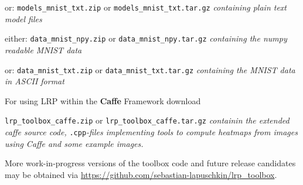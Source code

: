 \documentclass[a4wide]{article}
\begin{document}
or: \texttt{models\_mnist\_txt.zip} or \texttt{models\_mnist\_txt.tar.gz} \emph{containing plain text model files}

either: \texttt{data\_mnist\_npy.zip} or \texttt{data\_mnist\_npy.tar.gz} \emph{containing the numpy readable MNIST data}

or: \texttt{data\_mnist\_txt.zip} or \texttt{data\_mnist\_txt.tar.gz} \emph{containing the MNIST data in ASCII format}



\vspace{0.5cm}
For using LRP within the \textbf{Caffe} Framework download

\texttt{lrp\_toolbox\_caffe.zip} or \texttt{lrp\_toolbox\_caffe.tar.gz} \emph{containin the extended caffe source code,} \texttt{.cpp}\emph{-files implementing tools to compute heatmaps from images using Caffe and some example images.}

\vspace{0.5cm}
More work-in-progress versions of the toolbox code and future release candidates may be obtained via \url{https://github.com/sebastian-lapuschkin/lrp_toolbox}.
\end{document}
